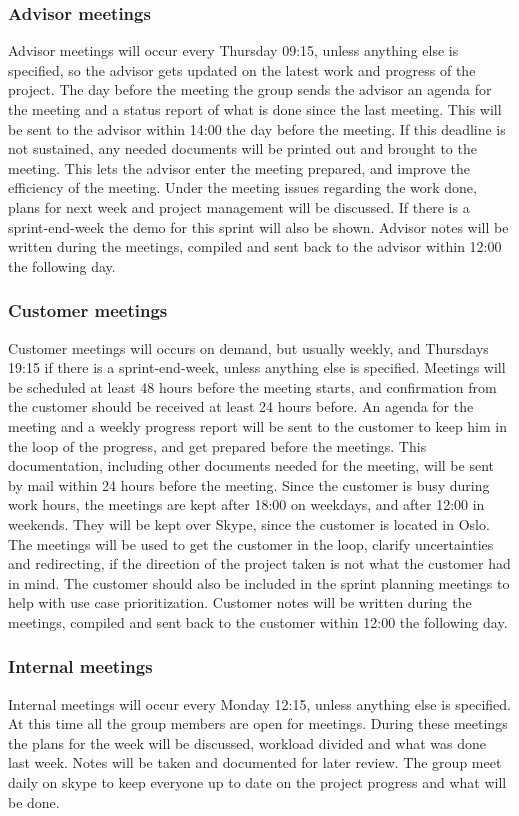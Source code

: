 \subsubsection{Advisor meetings}
Advisor meetings will occur every Thursday 09:15, unless anything else is specified, so the advisor gets updated on the latest work and progress of the project. The day before the meeting the group sends the advisor an agenda for the meeting and a status report of what is done since the last meeting. This will be sent to the advisor within 14:00 the day before the meeting. If this deadline is not sustained, any needed documents will be printed out and brought to the meeting. This lets the advisor enter the meeting prepared, and improve the efficiency of the meeting. Under the meeting issues regarding the work done, plans for next week and project management will be discussed. If there is a sprint-end-week the demo for this sprint will also be shown. Advisor notes will be written during the meetings, compiled and sent back to the advisor within 12:00 the following day.

\subsubsection{Customer meetings}
Customer meetings will occurs on demand, but usually weekly, and Thursdays 19:15 if there is a sprint-end-week, unless anything else is specified. Meetings will be scheduled at least 48 hours before the meeting starts, and confirmation from the customer should be received at least 24 hours before. An agenda for the meeting and a weekly progress report will be sent to the customer to keep him in the loop of the progress, and get prepared before the meetings. This documentation, including other documents needed for the meeting, will be sent by mail within 24 hours before the meeting. Since the customer is busy during work hours, the meetings are kept after 18:00 on weekdays, and after 12:00 in weekends. They will be kept over Skype, since the customer is located in Oslo. The meetings will be used to get the customer in the loop, clarify uncertainties and redirecting, if the direction of the project taken is not what the customer had in mind. The customer should also be included in the sprint planning meetings to help with use case prioritization. Customer notes will be written during the meetings, compiled and sent back to the customer within 12:00 the following day.

\subsubsection{Internal meetings}
Internal meetings will occur every Monday 12:15, unless anything else is specified. At this time all the group members are open for meetings. During these meetings the plans for the week will be discussed, workload divided and what was done last week. Notes will be taken and documented for later review. The group meet daily on skype to keep everyone up to date on the project progress and what will be done.

